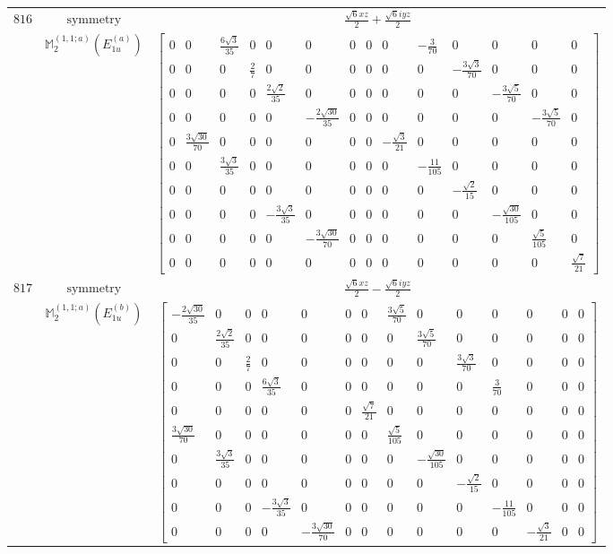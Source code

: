 \documentclass[fleqn,8pt,landscape]{jsarticle}
\begin{document}
\begin{longtable}{ccc}
$ 816 $ & $ \text{symmetry} $ & $ \frac{\sqrt{6} x z}{2} + \frac{\sqrt{6} i y z}{2} $ \\
$  $ & $ \mathbb{M}_{2}^{(1,1;a)}(E_{1u}^{(a)}) $ & $ \begin{bmatrix} 0 & 0 & \frac{6 \sqrt{3}}{35} & 0 & 0 & 0 & 0 & 0 & 0 & - \frac{3}{70} & 0 & 0 & 0 & 0 \\ 0 & 0 & 0 & \frac{2}{7} & 0 & 0 & 0 & 0 & 0 & 0 & - \frac{3 \sqrt{3}}{70} & 0 & 0 & 0 \\ 0 & 0 & 0 & 0 & \frac{2 \sqrt{2}}{35} & 0 & 0 & 0 & 0 & 0 & 0 & - \frac{3 \sqrt{5}}{70} & 0 & 0 \\ 0 & 0 & 0 & 0 & 0 & - \frac{2 \sqrt{30}}{35} & 0 & 0 & 0 & 0 & 0 & 0 & - \frac{3 \sqrt{5}}{70} & 0 \\ 0 & \frac{3 \sqrt{30}}{70} & 0 & 0 & 0 & 0 & 0 & 0 & - \frac{\sqrt{3}}{21} & 0 & 0 & 0 & 0 & 0 \\ 0 & 0 & \frac{3 \sqrt{3}}{35} & 0 & 0 & 0 & 0 & 0 & 0 & - \frac{11}{105} & 0 & 0 & 0 & 0 \\ 0 & 0 & 0 & 0 & 0 & 0 & 0 & 0 & 0 & 0 & - \frac{\sqrt{2}}{15} & 0 & 0 & 0 \\ 0 & 0 & 0 & 0 & - \frac{3 \sqrt{3}}{35} & 0 & 0 & 0 & 0 & 0 & 0 & - \frac{\sqrt{30}}{105} & 0 & 0 \\ 0 & 0 & 0 & 0 & 0 & - \frac{3 \sqrt{30}}{70} & 0 & 0 & 0 & 0 & 0 & 0 & \frac{\sqrt{5}}{105} & 0 \\ 0 & 0 & 0 & 0 & 0 & 0 & 0 & 0 & 0 & 0 & 0 & 0 & 0 & \frac{\sqrt{7}}{21} \end{bmatrix} $ \\ \hline
$ 817 $ & $ \text{symmetry} $ & $ \frac{\sqrt{6} x z}{2} - \frac{\sqrt{6} i y z}{2} $ \\
$  $ & $ \mathbb{M}_{2}^{(1,1;a)}(E_{1u}^{(b)}) $ & $ \begin{bmatrix} - \frac{2 \sqrt{30}}{35} & 0 & 0 & 0 & 0 & 0 & 0 & \frac{3 \sqrt{5}}{70} & 0 & 0 & 0 & 0 & 0 & 0 \\ 0 & \frac{2 \sqrt{2}}{35} & 0 & 0 & 0 & 0 & 0 & 0 & \frac{3 \sqrt{5}}{70} & 0 & 0 & 0 & 0 & 0 \\ 0 & 0 & \frac{2}{7} & 0 & 0 & 0 & 0 & 0 & 0 & \frac{3 \sqrt{3}}{70} & 0 & 0 & 0 & 0 \\ 0 & 0 & 0 & \frac{6 \sqrt{3}}{35} & 0 & 0 & 0 & 0 & 0 & 0 & \frac{3}{70} & 0 & 0 & 0 \\ 0 & 0 & 0 & 0 & 0 & 0 & \frac{\sqrt{7}}{21} & 0 & 0 & 0 & 0 & 0 & 0 & 0 \\ \frac{3 \sqrt{30}}{70} & 0 & 0 & 0 & 0 & 0 & 0 & \frac{\sqrt{5}}{105} & 0 & 0 & 0 & 0 & 0 & 0 \\ 0 & \frac{3 \sqrt{3}}{35} & 0 & 0 & 0 & 0 & 0 & 0 & - \frac{\sqrt{30}}{105} & 0 & 0 & 0 & 0 & 0 \\ 0 & 0 & 0 & 0 & 0 & 0 & 0 & 0 & 0 & - \frac{\sqrt{2}}{15} & 0 & 0 & 0 & 0 \\ 0 & 0 & 0 & - \frac{3 \sqrt{3}}{35} & 0 & 0 & 0 & 0 & 0 & 0 & - \frac{11}{105} & 0 & 0 & 0 \\ 0 & 0 & 0 & 0 & - \frac{3 \sqrt{30}}{70} & 0 & 0 & 0 & 0 & 0 & 0 & - \frac{\sqrt{3}}{21} & 0 & 0 \end{bmatrix} $ \\ \hline

\end{longtable}
\end{document}
